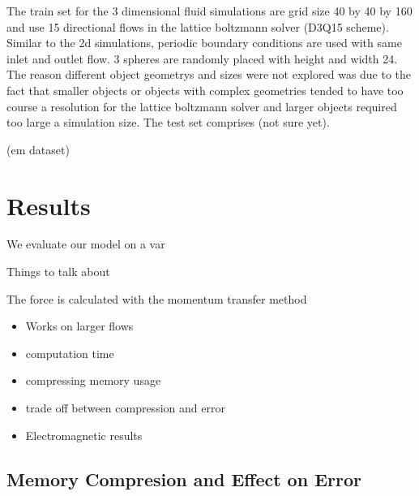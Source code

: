 \documentclass{article}
\begin{document}
The train set for the 3 dimensional fluid simulations are grid size 40 by 40 by 160 and use 15 directional flows in the lattice boltzmann solver (D3Q15 scheme). Similar to the 2d simulations, periodic boundary conditions are used with same inlet and outlet flow. 3 spheres are randomly placed with height and width 24. The reason different object geometrys and sizes were not explored was due to the fact that smaller objects or objects with complex geometries tended to have too course a resolution for the lattice boltzmann solver and larger objects required too large a simulation size. The test set comprises (not sure yet).

(em dataset)

\section{Results}

We evaluate our model on a var

Things to talk about \cite{tompson2016accelerating}

The force is calculated with the momentum transfer method \cite{guo2013lattice}

\begin{itemize}
  \item Works on larger flows
  \item computation time
  \item compressing memory usage
  \item trade off between compression and error
  \item Electromagnetic results
\end{itemize}

\subsection{Memory Compresion and Effect on Error}
\end{document}
